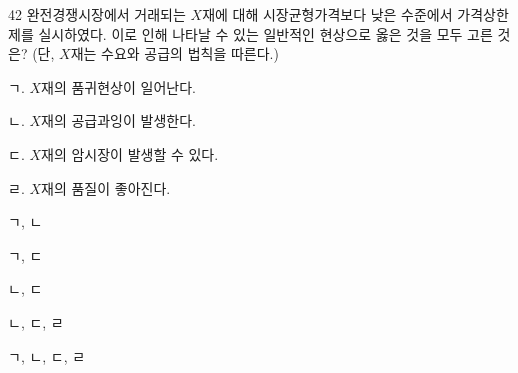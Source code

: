 \begin{question}{42}
완전경쟁시장에서 거래되는 $X$재에 대해 시장균형가격보다 낮은 수준에서 가격상한제를 실시하였다. 이로 인해 나타날 수 있는 일반적인 현상으로 옳은 것을 모두 고른 것은? (단, $X$재는 수요와 공급의 법칙을 따른다.)
\begin{framedtext}
ㄱ. $X$재의 품귀현상이 일어난다. \par
ㄴ. $X$재의 공급과잉이 발생한다. \par
ㄷ. $X$재의 암시장이 발생할 수 있다. \par
ㄹ. $X$재의 품질이 좋아진다. \par
\end{framedtext}
\begin{choices}
  \item ㄱ, ㄴ
  \item ㄱ, ㄷ
  \item ㄴ, ㄷ
  \item ㄴ, ㄷ, ㄹ
  \item ㄱ, ㄴ, ㄷ, ㄹ
\end{choices}
\end{question}
